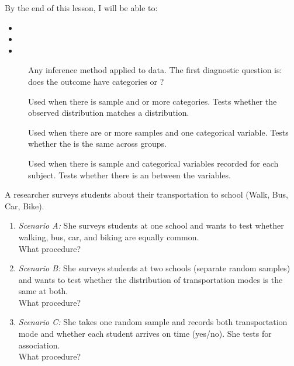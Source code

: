 \documentclass[10pt]{article}
\begin{document}
\namedateperiod

\vspace{0.10in}

\begin{objectivebox}
By the end of this lesson, I will be able to:
\begin{itemize}
  \item \writeline
  \item \writeline
  \item \writeline
\end{itemize}
\end{objectivebox}

\begin{vocabbox}
\begin{description}
  \item[]
        Any inference method applied to \blank{4cm} data. The first diagnostic question is:
        does the outcome have \blank{2cm} categories or \blank{3cm}?

  \item[]
        Used when there is \blank{2cm} sample and \blank{2cm} or more categories. Tests
        whether the observed distribution matches a \blank{5cm} distribution.

  \item[]
        Used when there are \blank{2.5cm} or more \blank{3cm} samples and one categorical
        variable. Tests whether the \blank{4.5cm} is the same across groups.

  \item[]
        Used when there is \blank{2cm} sample and \blank{2cm} categorical variables recorded
        for each subject. Tests whether there is an \blank{4cm} between the variables.
\end{description}
\end{vocabbox}

\begin{hookbox}
A researcher surveys students about their transportation to school (Walk, Bus, Car, Bike).
\begin{enumerate}
  \item \textit{Scenario A:} She surveys students at one school and wants to test whether
        walking, bus, car, and biking are equally common.\\
        What procedure? \blank{8cm}
  \item \textit{Scenario B:} She surveys students at two schools (separate random samples)
        and wants to test whether the distribution of transportation modes is the same at both.\\
        What procedure? \blank{8cm}
  \item \textit{Scenario C:} She takes one random sample and records both transportation mode
        and whether each student arrives on time (yes/no). She tests for association.\\
        What procedure? \blank{8cm}
\end{enumerate}
\end{hookbox}
\end{document}
